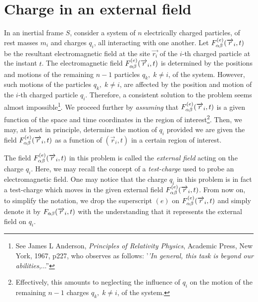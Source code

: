\section{Charge in an external field} 
In an inertial frame $S$, consider a system of $n$ 
electrically charged particles, of rest masses $m_i$ and 
charges $q_i$, all  interacting with one another. Let 
$F^{(e)}_{{\alpha}{\beta}}(\overrightarrow{r}_i,t)$ be the resultant 
electromagnetic field at the site $\vec{r_i}$ of the $i$-th 
charged particle at the instant $t$. The electromagnetic 
field  $F^{(e)}_{{\alpha}{\beta}}(\overrightarrow{r}_i,t)$ is determined by 
the positions and motions of the remaining $n-1$ particles 
$q_k,\;k\neq i$, of the system. However, such motions of 
the 
particles $q_k,\;k\neq i$, are affected by the position and 
motion of the $i$-th charged  particle $q_i$. Therefore, a 
consistent solution to the  problem seems almost 
impossible\footnote{See James L Anderson, 
\textit{Principles 
of Relativity Physics}, Academic Press, New York, 1967, 
p227, who observes as follows:  '\textsl{'In general, this 
task is beyond our abilities},...'' }. We proceed further 
by 
\textsl{assuming} that $F^{(e)}_{{\alpha}{\beta}}(\overrightarrow{r}_i,t)$ is 
a 
given function of the space and time coordinates in the 
region of interest\footnote{Effectively, this amounts to 
neglecting the influence of $q_i$ on the motion of the 
remaining $n-1$ charges $q_k,\;k\neq i$, of the 
system.}.  Then, we may, at least in principle, determine 
the  motion of $q_i$ provided we are given the field 
$F^{(e)}_{{\alpha}{\beta}}(\overrightarrow{r}_i,t)$ as a function of 
$(\vec{r}_i,t)$ in a certain region of interest.

The field $F^{(e)}_{{\alpha}{\beta}}(\overrightarrow{r}_i,t)$ in this problem 
is called the  \textsl{external field} acting on the 
charge $q_i$. Here, we may  recall the concept of a 
\textsl{test-charge} used to probe an  electromagnetic 
field. One may notice that the charge $q_i$ in this problem 
is in fact a test-charge which moves in the given external 
field $F^{(e)}_{{\alpha}{\beta}}(\overrightarrow{r}_i,t)$. From now on, to 
simplify the notation, we drop the superscript $(e)$ on 
$F^{(e)}_{{\alpha}{\beta}}(\overrightarrow{r}_i,t)$ and simply denote it by 
$F_{{\alpha}{\beta}}(\overrightarrow{r}_i,t)$ with the understanding that it 
represents the external field on $q_i$.

